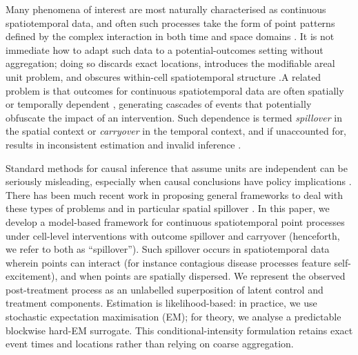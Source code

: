 \documentclass{statsoc}
\newcommand{\1}{\mathbbm{1}}
\begin{document}
Many phenomena of interest are most naturally characterised as continuous spatiotemporal data, and often such processes take the form of point patterns defined by the complex interaction in both time and space domains \citep{daley2003introduction}. %
It is not immediate how to adapt such data to a potential-outcomes setting without aggregation; doing so discards exact locations, introduces the modifiable areal unit problem, and obscures within-cell spatiotemporal structure \citep{fotheringham1991modifiable}.A related problem is that outcomes for continuous spatiotemporal data are often spatially or temporally dependent \citep{reich2021review}, generating cascades of events that potentially obfuscate the impact of an intervention. Such dependence is termed \textit{spillover} in the spatial context or \textit{carryover} in the temporal context, and if unaccounted for, results in inconsistent estimation and invalid inference \citep{papadogeorgou2019adjusting}.%

Standard methods for causal inference that assume units are independent can be seriously misleading, especially when causal conclusions have policy implications \citep{benjamin2018spillover,lee2021network}.  There has been much recent work in proposing general frameworks to deal with these types of problems \citep{papadogeorgou2022causal,jiang2023instrumental} and in particular spatial spillover \citep{papadogeorgou2023spatial}. In this paper, we develop a model-based framework for continuous spatiotemporal point processes under cell-level interventions with outcome spillover and carryover (henceforth, we refer to both as ``spillover''). Such spillover occurs in spatiotemporal data wherein points can interact (for instance contagious disease processes feature self-excitement), and when points are spatially dispersed.  We represent the observed post-treatment process as an unlabelled superposition of latent control and treatment components. Estimation is likelihood-based: in practice, we use stochastic expectation maximisation (EM); for theory, we analyse a predictable blockwise hard-EM surrogate. This conditional-intensity formulation retains exact event times and locations rather than relying on coarse aggregation. 
\end{document}
